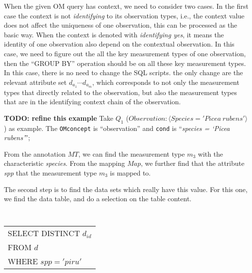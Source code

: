 When the given OM query has context, we need to consider two cases. 
In the first case the context is not {\em identifying} to its
observation types, i.e., the context value
does not affect the uniqueness of one observation, this can be
processed as the basic way. 
When the context is denoted with {\em identifying yes}, it means the
identity of one observation also depend on the contextual
observation. 
In this case, we need to figure out the all the key measurement types
of one observation, then the ``GROUP BY'' operation should be on all
these key measurement types. 
In this case, there is no need to change the SQL scripts.
the only change are the relevant attribute set $d_{a_1} \cdots
d_{a_m}$, which corresponds to not only the measurement types that
directly related to the observation, but also the measurement types
that are in the identifying context chain of the observation. 



\begin{example}\label{eg:query_reqerite_q1}
{\bf TODO: refine this example} 
Take $Q_1$ ($Observation: \langle Species='Picea~rubens'\rangle$) as
example. 
The {\tt OMconcept} is ``observation'' and {\tt cond} is ``{\em species = `Picea rubens'}''; 

From the annotation $MT$, we can find the measurement type
$m_3$ with the characteristic {\em species}. 
From the mapping $Map$, we further find that the attribute {\em spp} that the
measurement type $m_3$ is mapped to. 

The second step is to find the data sets which really have this value. 
For this one, we find the data table, and do a selection on the table
content. 

\vspace{0.1in}
{\tt 
\begin{tabular}{l} 
SELECT DISTINCT $d_{id}$\\
FROM $d$\\
WHERE $spp = 'piru'$
\end{tabular}
}
\vspace{0.1in}

\end{example}

